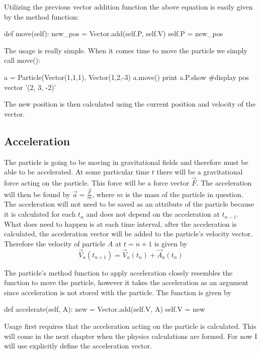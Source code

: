 \documentclass[15pt]{report}
\begin{document}
Utilizing the previous vector addition function the above equation is easily given by the method function:

\begin{code}
def move(self):
    new_pos = Vector.add(self.P, self.V)
    self.P = new_pos
\end{code}

The usage is really simple. When it comes time to move the particle we simply call move(): 

\begin{code}
a = Particle(Vector(1,1,1), Vector(1,2,-3)
a.move()
print a.P.show		#display pos vector
'(2, 3, -2)'   
\end{code}

The new position is then calculated using the current position and velocity of the vector.

\subsection{Acceleration} The particle is going to be moving in gravitational fields and therefore must be able to be accelerated. At some particular time $t$ there will be a gravitational force acting on the particle. This force will be a force vector $\vec{F}$. The acceleration will then be found by $\vec{a} = \frac{\vec{F}}{m}$, where $m$ is the mass of the particle in question. The acceleration will not need to be saved as an attribute of the particle because it is calculated for each $t_n$ and does not depend on the acceleration at $t_{n-1}$. What does need to happen is at each time interval, after the acceleration is calculated, the acceleration vector will be added to the particle's velocity vector. Therefore the velocity of particle $A$ at $t = {n + 1}$ is given by 
\begin{equation}
\vec{V}_a (t_{n+1}) = \vec{V}_a (t_n) + \vec{A}_a (t_n)
\end{equation}

The particle's method function to apply acceleration closely resembles the function to move the particle, however it takes the acceleration as an argument since acceleration is not stored with the particle.  The function is given by

\begin{code}
def accelerate(self, A):
    new = Vector.add(self.V, A)
    self.V = new
\end{code}

Usage first requires that the acceleration acting on the particle is calculated. This will come in the next chapter when the physics calculations are formed. For now I will use explicitly define the acceleration vector.
\end{document}
